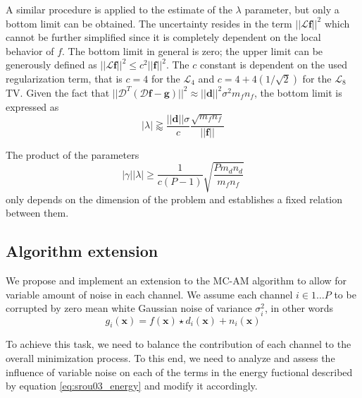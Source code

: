 \documentclass[12pt,notitlepage]{report}
\begin{document}
A similar procedure is applied to the estimate of the $\lambda$ parameter, but only a bottom limit can be obtained. The uncertainty resides in the term $||\mathcal{L} \mathbf{f}||^2$ which cannot be further simplified since it is completely dependent on the local behavior of $f$. The bottom limit in general is zero; the upper limit can be generously defined as $||\mathcal{L} \mathbf{f}||^2 \leq c^2 ||\mathbf{f}||^2$. The $c$ constant is dependent on the used regularization term, that is $c = 4$ for the $\mathcal{L}_4$ and $c = 4 + 4(1/\sqrt{2})$ for the $\mathcal{L}_8$ TV. Given the fact that $||\mathcal{D}^T (\mathcal{D} \mathbf{f} - \mathbf{g}) ||^2 \approx || \mathbf{d} ||^2 \sigma^2 m_f n_f$, the bottom limit is expressed as
\begin{equation}
\label{eq:srou03_lambda_estimate}
	|\lambda| \gtrapprox \frac{||\mathbf{d}||\sigma}{c} \frac{\sqrt{m_f n_f}}{||\mathbf{f}||}
\end{equation}

The product of the parameters 
\begin{equation}
\label{eq:srou03_lambda_estimate}
	|\gamma| |\lambda| \geq \frac{1}{c(P-1)} \sqrt{\frac{P m_d n_d}{m_f n_f}}
\end{equation}
only depends on the dimension of the problem and establishes a fixed relation between them.


\subsection{Algorithm extension}
\label{sec:srou03_extension}
We propose and implement an extension to the MC-AM algorithm to allow for variable amount of noise in each channel. We assume each channel $i \in {1 \dots P}$ to be corrupted by zero mean white Gaussian noise of variance $\sigma_i^2$, in other words
\begin{equation}
\label{eq:srou03_general_model_ext}
	g_i(\mathbf{x}) = f(\mathbf{x}) \star d_i(\mathbf{x}) + n_i(\mathbf{x}) 	
\end{equation}

To achieve this task, we need to balance the contribution of each channel to the overall minimization process. To this end, we need to analyze and assess the influence of variable noise on each of the terms in the energy fuctional described by equation \ref{eq:srou03_energy} and modify it accordingly. 
\end{document}
